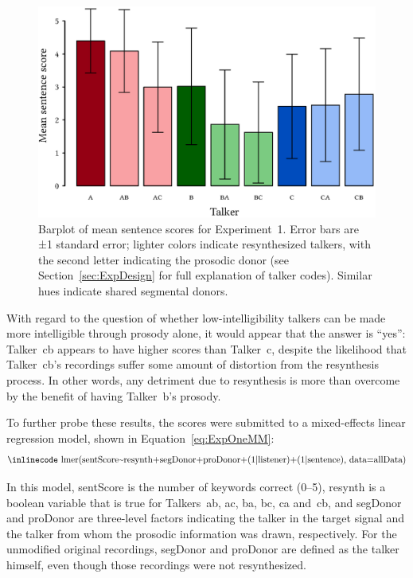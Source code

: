 \begin{figure}
	\begin{centering}
	\includegraphics{figures/results/ExpOneBarplot.eps}
	\caption[Barplot of mean sentence scores for Experiment~1]{Barplot of mean sentence scores for Experiment~1.  Error bars are ±1 standard error; lighter colors indicate resynthesized talkers, with the second letter indicating the prosodic donor (see Section~\ref{sec:ExpDesign} for full explanation of talker codes).  Similar hues indicate shared segmental donors.\label{fig:ExpOneBarplot}}
	\end{centering}
\end{figure}

With regard to the question of whether low-intelligibility talkers can be made more intelligible through prosody alone, it would appear that the answer is “yes”: Talker~\ac{cb} appears to have higher scores than Talker~\ac{c}, despite the likelihood that Talker~\ac{cb}’s recordings suffer some amount of distortion from the resynthesis process.  In other words, any detriment due to resynthesis is more than overcome by the benefit of having Talker~\ac{b}’s prosody.  

To further probe these results, the scores were submitted to a mixed-effects linear regression model, shown in Equation~\ref{eq:ExpOneMM}:
\begin{equation}\label{eq:ExpOneMM}
	\text{{\small \inlinecode lmer(sentScore\textasciitilde resynth+segDonor+proDonor+(1|listener)+(1|sentence), data=allData)}}
\end{equation}

In this model, {\inlinecode sentScore} is the number of keywords correct (0–5), {\inlinecode resynth} is a boolean variable that is true for Talkers~\ac{ab}, \ac{ac}, \ac{ba}, \ac{bc}, \ac{ca} and~\ac{cb}, and {\inlinecode segDonor} and {\inlinecode proDonor} are three-level factors indicating the talker in the target signal and the talker from whom the prosodic information was drawn, respectively.  For the unmodified original recordings, {\inlinecode segDonor} and {\inlinecode proDonor} are defined as the talker himself, even though those recordings were not resynthesized.  

